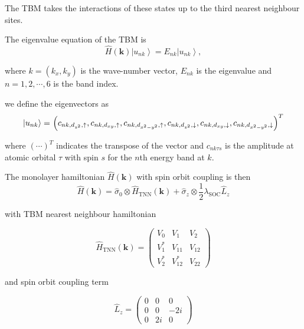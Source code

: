 \documentclass[10pt, twocolumn]{article} %
\begin{document}
  The TBM takes the interactions of these states up to the third nearest neighbour sites.

  The eigenvalue equation of the TBM is 
      \begin{equation}
        \label{TBM_evalue_eqn}
        \hat{H}(\boldsymbol{k})\left|u_{n k}\right\rangle=E_{n k}\left|u_{n k}\right\rangle,
      \end{equation}

   where $k=\left(k_{x}, k_{y}\right)$ is the wave-number vector, $E_{nk}$ is the eigenvalue and $n = 1,2,\cdots,6$ is the band index.

   we define the eigenvectors as
      \begin{equation}
        \left|u_{n k}\right\rangle=$ $\left(c_{n k, d_{z^{2}}, \uparrow}, c_{n k, d_{x y}, \uparrow}, c_{n k, d_{x^{2}-y^{2}}, \uparrow}, c_{n k, d_{z^{2}}, \downarrow}, c_{n k, d_{x y}, \downarrow}, c_{n k, d_{x^{2}-y^{2}}, \downarrow}\right)^{T}
      \end{equation}

  where $(\cdots)^T$ indicates the transpose of the vector and $c_{nk\tau s}$ is the amplitude at atomic orbital $\tau$ with spin $s$ for the $n$th energy band at $k$.

  The monolayer hamiltonian $\hat{H}(\boldsymbol{k})$ with spin orbit coupling is then 
      \begin{equation}
        \hat{H}(\boldsymbol{k})=\hat{\sigma}_{0} \otimes \hat{H}_{\mathrm{TNN}}(\boldsymbol{k})+\hat{\sigma}_{z} \otimes \frac{1}{2} \lambda_{\mathrm{SOC}} \hat{L}_{z}
      \end{equation}

      with TBM nearest neighbour hamiltonian

      \begin{equation}
        \hat{H}_{\mathrm{TNN}}(\boldsymbol{k})=\left(\begin{array}{ccc}
        V_{0} & V_{1} & V_{2} \\
        V_{1}^{*} & V_{11} & V_{12} \\
        V_{2}^{*} & V_{12}^{*} & V_{22}
        \end{array}\right)
      \end{equation}

  and spin orbit coupling term

      \begin{equation}
        \hat{L}_{z}=\left(\begin{array}{ccc}
        0 & 0 & 0 \\
        0 & 0 & -2 i \\
        0 & 2 i & 0
        \end{array}\right)
      \end{equation}
\end{document}
